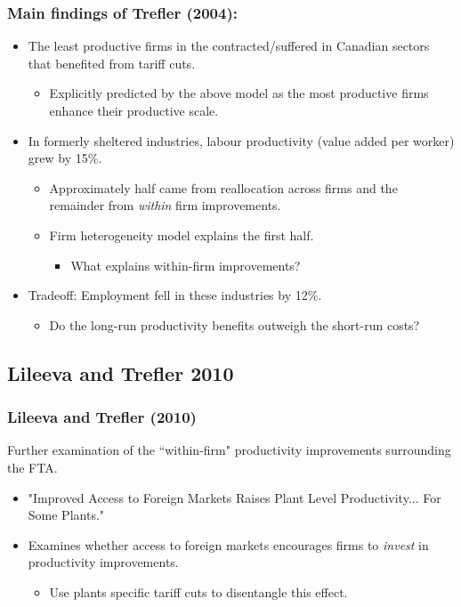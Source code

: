 \documentclass{beamer}
\begin{document}
\begin{frame}
	\frametitle{Main findings of Trefler (2004):}

\begin{itemize}
	\item The least productive firms in the contracted/suffered in Canadian sectors that benefited from tariff cuts. \\
	\begin{itemize}
		\item Explicitly predicted by the above model as the most productive firms enhance their productive scale.
	\end{itemize}

	\item In formerly sheltered industries, labour productivity (value added per worker) grew by 15\%.
	\begin{itemize}
		\item Approximately half came from reallocation across firms and the remainder from \emph{within} firm improvements.
		\item Firm heterogeneity model explains the first half.
		\begin{itemize}
			\item What explains within-firm improvements?
		\end{itemize}
	\end{itemize}
	\item Tradeoff: Employment fell in these industries by 12\%.
		\begin{itemize}
			\item Do the long-run productivity benefits outweigh the short-run costs?
		\end{itemize}
	\end{itemize}

\end{frame}

\subsection{Lileeva and Trefler 2010}

\begin{frame}
	\frametitle{Lileeva and Trefler (2010)}

Further examination of the ``within-firm" productivity improvements surrounding the FTA.
\begin{itemize}
	\item "Improved Access to Foreign Markets Raises Plant Level Productivity... For Some Plants."
	\item Examines whether access to foreign markets encourages firms to \emph{invest} in productivity improvements.
		\begin{itemize}
			\item Use plants specific tariff cuts to disentangle this effect.
		\end{itemize}
\end{itemize}
\end{frame}
\end{document}
